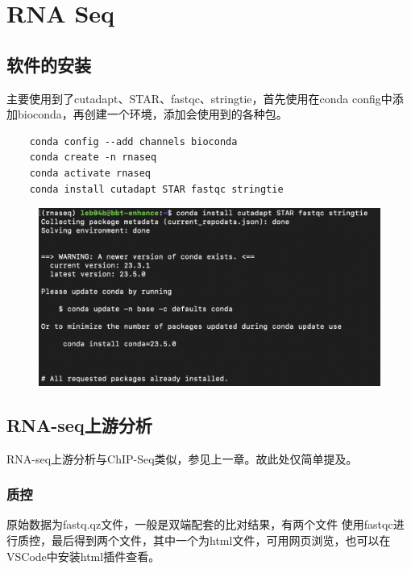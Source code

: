\chapter{RNA Seq}

\section{软件的安装}
主要使用到了cutadapt、STAR、fastqc、stringtie，首先使用在conda config中添加bioconda，再创建一个环境，添加会使用到的各种包。
\begin{lstlisting}
    conda config --add channels bioconda
    conda create -n rnaseq
    conda activate rnaseq
    conda install cutadapt STAR fastqc stringtie
\end{lstlisting}

\begin{figure}[ht]
    \includegraphics[width=13cm]{image/rnaseq/package.PNG}
\end{figure}

\section{RNA-seq上游分析}
RNA-seq上游分析与ChIP-Seq类似，参见上一章。故此处仅简单提及。

\subsection{质控}
原始数据为fastq.qz文件，一般是双端配套的比对结果，有两个文件
使用fastqc进行质控，最后得到两个文件，其中一个为html文件，可用网页浏览，也可以在VSCode中安装html插件查看。

